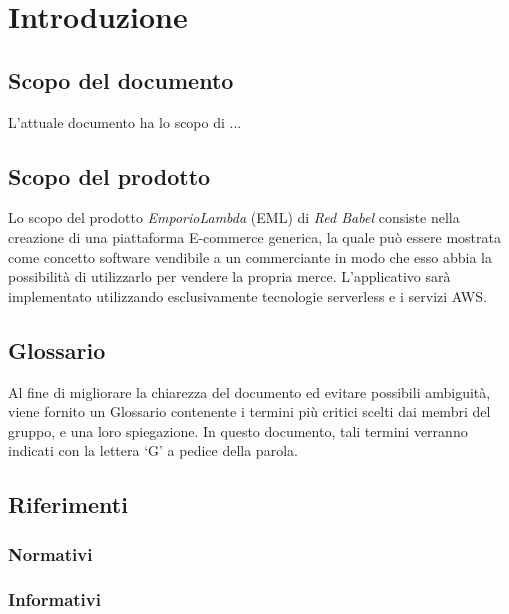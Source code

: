 \section{Introduzione}
\subsection{Scopo del documento}
L'attuale documento ha lo scopo di ...
\subsection{Scopo del prodotto}
Lo scopo del prodotto \textit{EmporioLambda} (EML) di \textit{Red Babel} consiste nella creazione di una piattaforma E-commerce generica, la quale può essere mostrata come concetto software vendibile a un commerciante in modo che esso abbia la possibilità di utilizzarlo per vendere la propria merce. L'applicativo sarà implementato utilizzando esclusivamente tecnologie serverless e i servizi AWS.
\subsection{Glossario}
Al fine di migliorare la chiarezza del documento ed evitare possibili ambiguità, viene fornito un Glossario contenente i termini più critici scelti dai membri del gruppo, e una loro spiegazione. In questo documento, tali termini verranno indicati con la lettera `G' a pedice della parola.
\subsection{Riferimenti}
\subsubsection{Normativi}

\subsubsection{Informativi}
